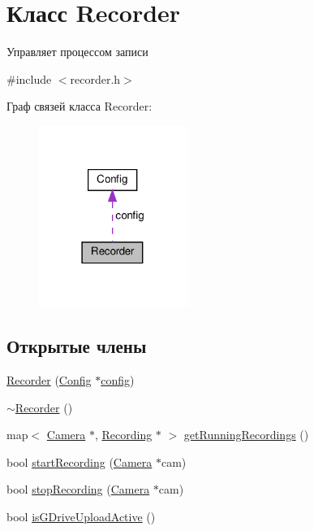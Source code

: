 \hypertarget{class_recorder}{}\section{Класс Recorder}
\label{class_recorder}


Управляет процессом записи  




{\ttfamily \#include $<$recorder.\+h$>$}



Граф связей класса Recorder\+:\nopagebreak
\begin{figure}[H]
\begin{center}
\leavevmode
\includegraphics[width=138pt]{class_recorder__coll__graph}
\end{center}
\end{figure}
\subsection*{Открытые члены}
\begin{DoxyCompactItemize}
\item 
\hyperlink{class_recorder_aa3cf7e6df22a7a21e8939e1dc1d02ea1}{Recorder} (\hyperlink{class_config}{Config} $\ast$\hyperlink{class_recorder_acc5a095c1d30b547c994f817438c054b}{config})
\item 
\hyperlink{class_recorder_a6b3c569577fcdc298d8d4a6a2b96e9a9}{$\sim$\+Recorder} ()
\item 
map$<$ \hyperlink{struct_camera}{Camera} $\ast$, \hyperlink{class_recording}{Recording} $\ast$ $>$ \hyperlink{class_recorder_afb29e7ee1c1d78b3b2c9e54133f88b62}{get\+Running\+Recordings} ()
\item 
bool \hyperlink{class_recorder_ac242ca5967dbf81f9ea39464eee2b06a}{start\+Recording} (\hyperlink{struct_camera}{Camera} $\ast$cam)
\item 
bool \hyperlink{class_recorder_ae3de658eb341149ef0fb207783b3602b}{stop\+Recording} (\hyperlink{struct_camera}{Camera} $\ast$cam)
\item 
bool \hyperlink{class_recorder_a2c3f20dfa022c936ede65ca34becb890}{is\+G\+Drive\+Upload\+Active} ()
\end{DoxyCompactItemize}
